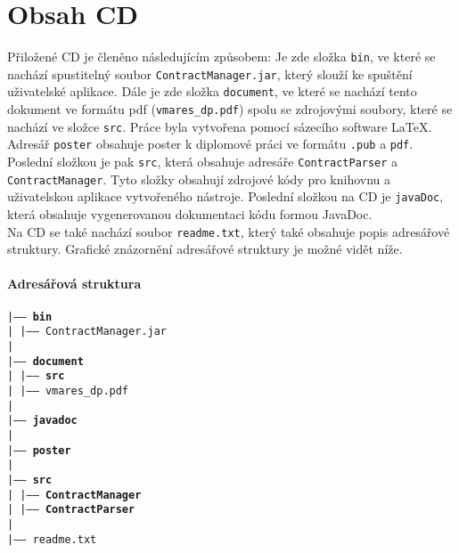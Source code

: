 \chapter{Obsah CD}
	Přiložené CD je členěno následujícím způsobem: Je zde složka \texttt{bin}, ve které se nachází spustitelný soubor \texttt{ContractManager.jar}, který slouží ke spuštění uživatelské aplikace. Dále je zde složka \texttt{document}, ve které se nachází tento dokument ve formátu pdf (\texttt{vmares\_dp.pdf}) spolu se zdrojovými soubory, které se nachází ve složce \texttt{src}. Práce byla vytvořena pomocí sázecího software LaTeX.\\
	
	Adresář \texttt{poster} obsahuje poster k diplomové práci ve formátu \texttt{.pub} a \texttt{pdf}. Poslední složkou je pak \texttt{src}, která obsahuje adresáře \texttt{ContractParser} a \texttt{ContractManager}. Tyto složky obsahují zdrojové kódy pro knihovnu a uživatelskou aplikace vytvořeného nástroje. Poslední složkou na CD je \texttt{javaDoc}, která obsahuje vygenerovanou dokumentaci kódu formou JavaDoc.\\
	
	Na CD se také nachází soubor \texttt{readme.txt}, který také obsahuje popis adresářové struktury. Grafické znázornění adresářové struktury je možné vidět níže.

	\subsubsection{Adresářová struktura}
	\noindent
	\texttt{|----- \textbf{bin}}\\
	\texttt{|\- \- \- \- |----- ContractManager.jar}\\
	\texttt{|}\\
	\texttt{|----- \textbf{document}}\\
	\texttt{|\- \- \- \- |----- \textbf{src}}\\
	\texttt{|\- \- \- \- |----- vmares\_dp.pdf}\\
	\texttt{|}\\
	\texttt{|----- \textbf{javadoc}}\\
	\texttt{|}\\
	\texttt{|----- \textbf{poster}}\\
	\texttt{|}\\
	\texttt{|----- \textbf{src}}\\
	\texttt{|\- \- \- \- |----- \textbf{ContractManager}}\\
	\texttt{|\- \- \- \- |----- \textbf{ContractParser}}\\
	\texttt{|}\\
	\texttt{|----- readme.txt}\\